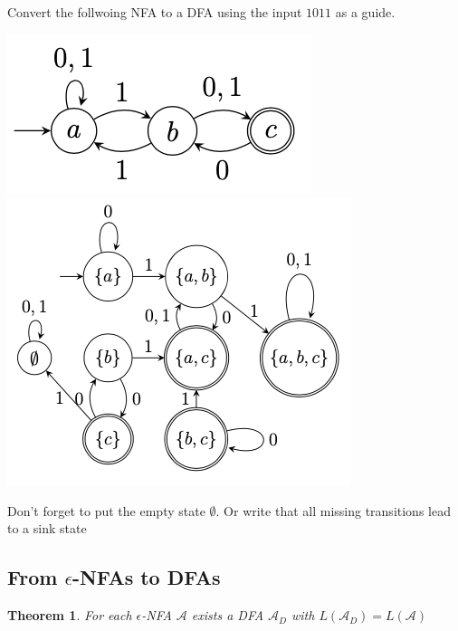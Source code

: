 \documentclass[a3paper, 8pt]{extarticle}
\newtheorem{theorem}{Theorem}[section]
\begin{document}
\begin{multicols*}{6}
Convert the follwoing NFA to a DFA  using the input $1011$ as a guide. 
\begin{center}
\includegraphics[width=0.5
\columnwidth]{images/Screen Shot 2022-12-24 at 13.00.46.png}
\includegraphics[width=0.8\columnwidth]{images/Screen Shot 2022-12-24 at 13.14.52.png}

\end{center}

Don't forget to put the empty state $\emptyset$. Or write that all missing transitions lead to a sink state

\subsection{From $\epsilon$-NFAs to DFAs}


\begin{theorem}
    For each $\epsilon$-NFA $\mathcal{A}$ exists a DFA $\mathcal{A}_D$ with $L(\mathcal{A}_D) = L(\mathcal{A})$
\end{theorem}


\end{multicols*}
\end{document}

